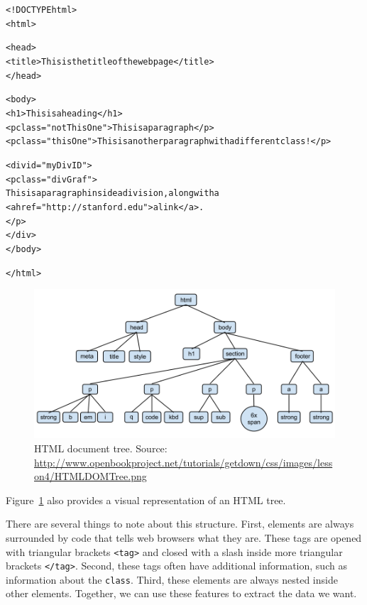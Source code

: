 \documentclass{article}\usepackage[]{graphicx}\usepackage[]{color}
\makeatletter
\newcommand{\hlstr}[1]{\textcolor[rgb]{0.192,0.494,0.8}{#1}}%
\newenvironment{kframe}{%
 \def\at@end@of@kframe{}%
 \ifinner\ifhmode%
  \def\at@end@of@kframe{\end{minipage}}%
  \begin{minipage}{\columnwidth}%
 \fi\fi%
 \def\FrameCommand##1{\hskip\@totalleftmargin \hskip-\fboxsep
 \colorbox{shadecolor}{##1}\hskip-\fboxsep
     \hskip-\linewidth \hskip-\@totalleftmargin \hskip\columnwidth}%
 \MakeFramed {\advance\hsize-\width
   \@totalleftmargin\z@ \linewidth\hsize
   \@setminipage}}%
 {\par\unskip\endMakeFramed%
 \at@end@of@kframe}
\newenvironment{knitrout}{}{} %
\makeatother
\begin{document}
\begin{knitrout}
\color{fgcolor}\begin{kframe}
\begin{alltt}
<!DOCTYPE html> 
<html> 
  
  <head>
    <title>This is the title of the webpage</title>
  </head>
  
  <body>
    <h1>This is a heading</h1>  
    <p class=\hlstr{"notThisOne"}>This is a paragraph</p>  
    <p class=\hlstr{"thisOne"}>This is another paragraph with a different class!</p>  
    
    <div id=\hlstr{"myDivID"}> 
      <p class=\hlstr{"divGraf"}> 
        This is a paragraph inside a division, along with a 
        <a href=\hlstr{"http://stanford.edu"}>a link</a>.
      </p> 
    </div>
  </body> 

</html>
\end{alltt}
\end{kframe}
\end{knitrout}

\begin{figure}
  \centering
  \includegraphics[width=.75\textwidth]{HTMLDOMTree.png}
  \caption{HTML document tree. Source: \url{http://www.openbookproject.net/tutorials/getdown/css/images/lesson4/HTMLDOMTree.png}}\label{fig:htmltree}
\end{figure}

Figure~\ref{fig:htmltree} also provides a visual representation of an HTML tree. 

There are several things to note about this structure. First, elements are always surrounded by code that tells web browsers what they are. These tags are opened with triangular brackets \verb!<tag>! and closed with a slash inside more triangular brackets \verb!</tag>!. Second, these tags often have additional information, such as information about the \texttt{class}. Third, these elements are always nested inside other elements. Together, we can use these features to extract the data we want. 
\end{document}
